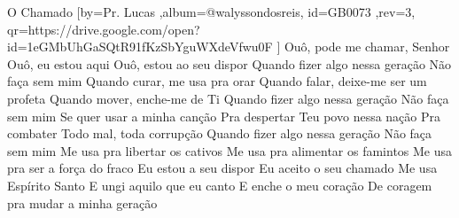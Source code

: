 \beginsong
{O Chamado %
}[by={Pr. Lucas %
},album={@walyssondosreis},
id={GB0073 %
},rev={3}, %
qr={https://drive.google.com/open?id=1eGMbUhGaSQtR91fKzSbYguWXdeVfwu0F %
}]
\beginchorus
Ouô, pode me chamar, Senhor
Ouô, eu estou aqui
Ouô, estou ao seu dispor
Quando fizer algo nessa geração
Não faça sem mim
\endchorus
{}
\beginverse
Quando curar, me usa pra orar
Quando falar, deixe-me ser um profeta
Quando mover, enche-me de Ti
Quando fizer algo nessa geração
Não faça sem mim
\endverse
{}
\beginverse
Se quer usar a minha canção
Pra despertar
Teu povo nessa nação
Pra combater
Todo mal, toda corrupção
Quando fizer algo nessa geração
Não faça sem mim
\endverse
{}
\beginverse
Me usa pra libertar os cativos
Me usa pra alimentar os famintos
Me usa pra ser a força do fraco
Eu estou a seu dispor
Eu aceito o seu chamado
Me usa Espírito Santo
E ungi aquilo que eu canto
E enche o meu coração
De coragem pra mudar a minha geração
\endverse
{}

